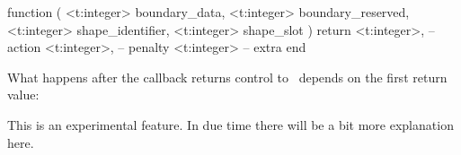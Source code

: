 \starttyping[option=LUA]
function (
    <t:integer> boundary_data,
    <t:integer> boundary_reserved,
    <t:integer> shape_identifier,
    <t:integer> shape_slot
)
    return
        <t:integer>, -- action
        <t:integer>, -- penalty
        <t:integer>  -- extra
end
\stoptyping

What happens after the callback returns control to \TEX\ depends on the first
return value:


This is an experimental feature. In due time there will be a bit more explanation
here.

\stopsubsection

\stopsection

\stopdocument

